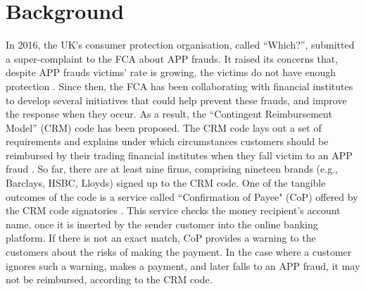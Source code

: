 
\section{Background}\label{sec::background}



In  2016, the UK's consumer protection organisation, called ``Which?'', submitted a super-complaint to the FCA about  APP frauds. It raised its concerns that, despite  APP frauds victims' rate is  growing, the victims do not have enough protection \cite{Which?-super-complaint}.  Since then, the FCA has been collaborating with financial institutes  to develop several initiatives that
could help prevent these frauds, and improve the response when they  occur. As a result,  the ``Contingent Reimbursement Model'' (CRM) code has been proposed. The  CRM code  lays out a set of requirements and explains under which circumstances customers should be reimbursed by their trading financial institutes when they fall victim to an APP fraud \cite{CRM-code}. So far,  there are at least nine firms, comprising nineteen brands (e.g., Barclays, HSBC,  Lloyds) signed up to the CRM code. One of the tangible outcomes of the code is a service called ``Confirmation of Payee" (CoP)  offered by the CRM code signatories \cite{CoP}. This service checks the money recipient's account name, once it is inserted by the sender customer into the online banking platform. If there is not an exact match, CoP provides a warning to the  customers about the risks of making the payment. In the case where a customer ignores such a warning, makes a payment, and later falls to an APP fraud,  it may not be reimbursed, according to the CRM code.

